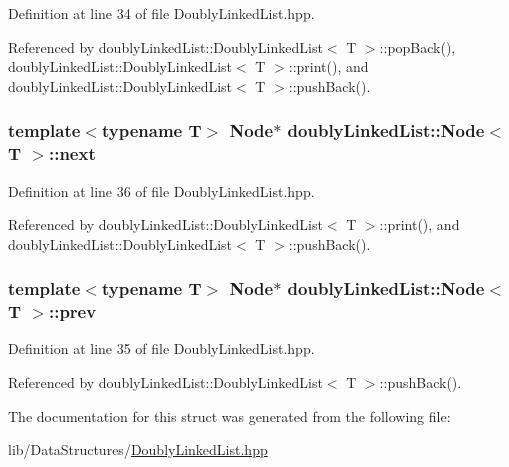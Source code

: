 Definition at line 34 of file Doubly\-Linked\-List.\-hpp.



Referenced by doubly\-Linked\-List\-::\-Doubly\-Linked\-List$<$ T $>$\-::pop\-Back(), doubly\-Linked\-List\-::\-Doubly\-Linked\-List$<$ T $>$\-::print(), and doubly\-Linked\-List\-::\-Doubly\-Linked\-List$<$ T $>$\-::push\-Back().

\hypertarget{structdoublyLinkedList_1_1Node_a1513e3f4f530d95c634deeb9ed9cfdbe}{
\subsubsection[{next}]{\setlength{\rightskip}{0pt plus 5cm}template$<$typename T$>$ {\bf Node}$\ast$ {\bf doubly\-Linked\-List\-::\-Node}$<$ T $>$\-::next}}\label{structdoublyLinkedList_1_1Node_a1513e3f4f530d95c634deeb9ed9cfdbe}


Definition at line 36 of file Doubly\-Linked\-List.\-hpp.



Referenced by doubly\-Linked\-List\-::\-Doubly\-Linked\-List$<$ T $>$\-::print(), and doubly\-Linked\-List\-::\-Doubly\-Linked\-List$<$ T $>$\-::push\-Back().

\hypertarget{structdoublyLinkedList_1_1Node_ac5e129edb8062b6dde2866cd930e960d}{
\subsubsection[{prev}]{\setlength{\rightskip}{0pt plus 5cm}template$<$typename T$>$ {\bf Node}$\ast$ {\bf doubly\-Linked\-List\-::\-Node}$<$ T $>$\-::prev}}\label{structdoublyLinkedList_1_1Node_ac5e129edb8062b6dde2866cd930e960d}


Definition at line 35 of file Doubly\-Linked\-List.\-hpp.



Referenced by doubly\-Linked\-List\-::\-Doubly\-Linked\-List$<$ T $>$\-::push\-Back().



The documentation for this struct was generated from the following file\-:\begin{DoxyCompactItemize}
\item 
lib/\-Data\-Structures/\hyperlink{DoublyLinkedList_8hpp}{Doubly\-Linked\-List.\-hpp}\end{DoxyCompactItemize}
